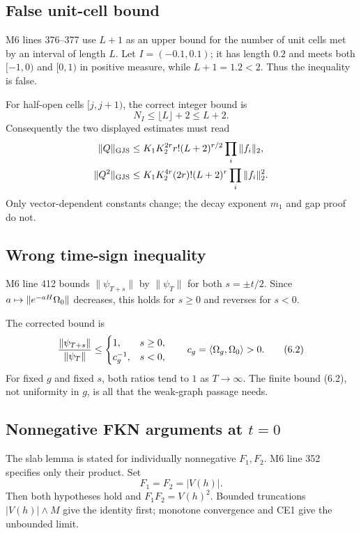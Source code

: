 \documentclass[10pt,a4paper]{article}
\begin{document}
\subsection{False unit-cell bound}

M6 lines 376--377 use $L+1$ as an upper bound for the number of unit cells met by an
interval of length $L$.  Let $I=(-0.1,0.1)$; it has length $0.2$ and meets both
$[-1,0)$ and $[0,1)$ in positive measure, while $L+1=1.2<2$.  Thus the inequality is
false.

For half-open cells $[j,j+1)$, the correct integer bound is
\[
 N_I\leq\lfloor L\rfloor+2\leq L+2.                               \tag{6.1}
\]
Consequently the two displayed estimates must read
\begin{align*}
 \|Q\|_{\rm GJS}
 &\leq K_1K_2^{2r}r!(L+2)^{r/2}\prod_i\|f_i\|_2,\\
 \|Q^2\|_{\rm GJS}
 &\leq K_1K_2^{4r}(2r)!(L+2)^r\prod_i\|f_i\|_2^2.
\end{align*}
Only vector-dependent constants change; the decay exponent $m_1$ and gap proof do not.

\subsection{Wrong time-sign inequality}

M6 line 412 bounds $\|\psi_{T+s}\|$ by $\|\psi_T\|$ for both
$s=\pm t/2$.  Since $a\mapsto\|e^{-aH}\Omega_0\|$ decreases, this holds for $s\geq0$
and reverses for $s<0$.

The corrected bound is
\[
 \frac{\|\psi_{T+s}\|}{\|\psi_T\|}
 \leq\begin{cases}1,&s\geq0,\\c_g^{-1},&s<0,
 \end{cases}
 \qquad c_g=\langle \Omega_g,\Omega_0\rangle>0.                                  \tag{6.2}
\]
For fixed $g$ and fixed $s$, both ratios tend to $1$ as $T\to\infty$.  The finite
bound (6.2), not uniformity in $g$, is all that the weak-graph passage needs.

\subsection{Nonnegative FKN arguments at \texorpdfstring{$t=0$}{t=0}}

The slab lemma is stated for individually nonnegative $F_1,F_2$.  M6 line 352 specifies
only their product.  Set
\[
 F_1=F_2=|V(h)|.
\]
Then both hypotheses hold and $F_1F_2=V(h)^2$.  Bounded truncations
$|V(h)|\wedge M$ give the identity first; monotone convergence and CE1 give the
unbounded limit.
\end{document}
